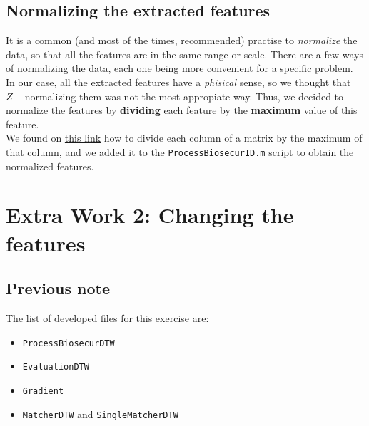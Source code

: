 \documentclass[a4paper]{article}
\def\inline{\lstinline[basicstyle=\ttfamily,keywordstyle={}]}
\begin{document}
{\subsection{Normalizing the extracted features}

It is a common (and most of the times, recommended) practise to \emph{normalize} the data, so that all the features are in the same range or scale. There are a few ways of normalizing the data, each one being more convenient for a specific problem. In our case, all the extracted features have a \emph{phisical} sense, so we thought that \(Z-\)normalizing them was not the most appropiate way. Thus, we decided to normalize the features by \textbf{dividing} each feature by the \textbf{maximum} value of this feature.\\

We found on \href{%
}{this link} how to divide each column of a matrix by the maximum of that column, and we added it to the \inline{ProcessBiosecurID.m} script to obtain the normalized features.




\section{Extra Work 2: Changing the features}

\subsection*{Previous note}
The list of developed files for this exercise are:

\begin{itemize}
\item \inline{ProcessBiosecurDTW}
\item \inline{EvaluationDTW}
\item \inline{Gradient}
\item \inline{MatcherDTW} and \inline{SingleMatcherDTW}
\end{itemize}

}
\end{document}
